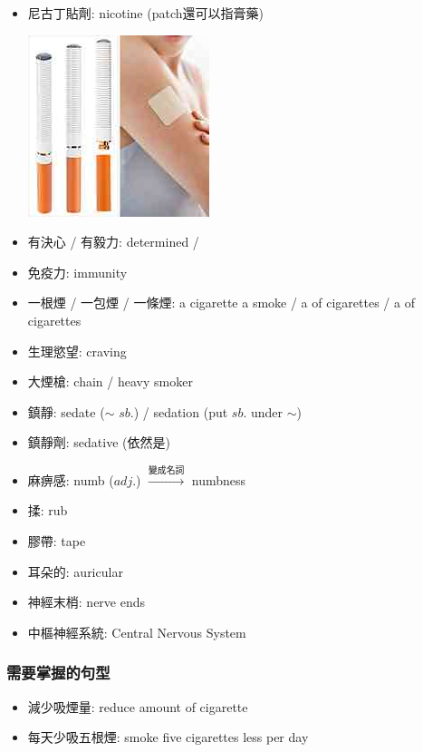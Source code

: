 \begin{itemize}
\begin{center}
  \end{center}
  \item 尼古丁貼劑: nicotine  (patch還可以指膏藥)
  \begin{center}
    \includegraphics[scale=.7]{pics/nicotine-patches}
  \end{center}
  \item 有決心 / 有毅力: determined / 
  \item 免疫力: immunity
  \item 一根煙 / 一包煙 / 一條煙: a cigarette a smoke / a  of cigarettes / a  of cigarettes
  \item 生理慾望: craving
  \item 大煙槍: chain / heavy smoker
  \item 鎮靜: sedate ($\sim$ $sb.$) / sedation (put $sb.$ under $\sim$)
  \item 鎮靜劑: sedative (依然是) 
  \item 麻痹感: numb ($adj.$) $\xrightarrow{\text{變成名詞}}$ numbness
  \item 揉: rub
  \item 膠帶: tape
  \item 耳朵的: auricular
  \item 神經末梢: nerve ends
  \item 中樞神經系統: Central Nervous System
\end{itemize}

\subsubsection*{需要掌握的句型}
\begin{itemize}
  \itemsep0em
  \item 減少吸煙量: reduce amount of cigarette
  \item 每天少吸五根煙: smoke five cigarettes less per day
\end{itemize}

